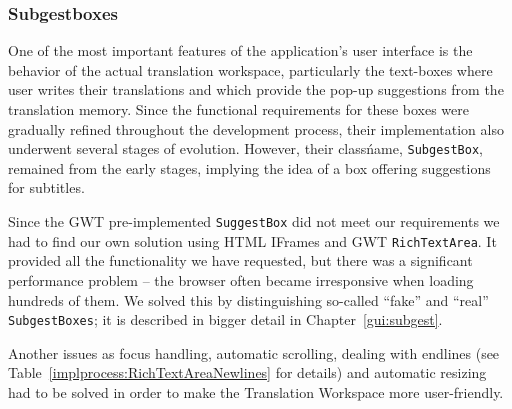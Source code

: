 \subsubsection{Subgestboxes}

One of the most important features of the application's user interface is the behavior of the actual translation workspace, particularly the text-boxes where user writes their translations and which provide the pop-up suggestions from the translation memory. Since the functional requirements for these boxes were gradually refined throughout the development process, their implementation also underwent several stages of evolution. However, their class\' name, {\tt SubgestBox}, remained from the early stages, implying the idea of a box offering suggestions for subtitles.

Since the GWT pre-implemented {\tt SuggestBox} did not meet our requirements we had to find our own solution using HTML IFrames and GWT {\tt RichTextArea}. It provided all the functionality we have requested, but there was a significant performance problem -- the browser often became irresponsive when loading hundreds of them. We solved this by distinguishing so-called ``fake'' and ``real'' {\tt SubgestBoxes}; it is described in bigger detail in Chapter~\ref{gui:subgest}.



Another issues as focus handling, automatic scrolling, dealing with endlines (see Table~\ref{implprocess:RichTextAreaNewlines} for details) and automatic resizing had to be solved in order to make the Translation Workspace more user-friendly.

